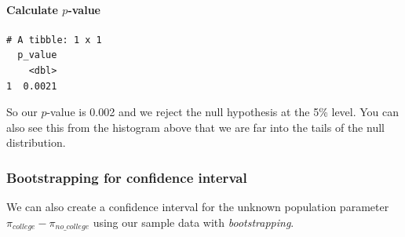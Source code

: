 \documentclass[12pt,]{krantz}
\makeatletter
\newenvironment{Shaded}{\begin{snugshade}}{\end{snugshade}}
\newcommand{\KeywordTok}[1]{\textcolor[rgb]{0.27,0.27,0.27}{\textbf{#1}}}
\newcommand{\DataTypeTok}[1]{\textcolor[rgb]{0.27,0.27,0.27}{#1}}
\newcommand{\DecValTok}[1]{\textcolor[rgb]{0.06,0.06,0.06}{#1}}
\newcommand{\StringTok}[1]{\textcolor[rgb]{0.5,0.5,0.5}{#1}}
\newcommand{\OperatorTok}[1]{\textcolor[rgb]{0.43,0.43,0.43}{\textbf{#1}}}
\newcommand{\NormalTok}[1]{#1}
\let\oldparagraph\paragraph
\renewcommand{\paragraph}[1]{\oldparagraph{#1}\mbox{}}
\newenvironment{kframe}{%
\medskip{}
\setlength{\fboxsep}{.8em}
 \def\at@end@of@kframe{}%
 \ifinner\ifhmode%
  \def\at@end@of@kframe{\end{minipage}}%
  \begin{minipage}{\columnwidth}%
 \fi\fi%
 \def\FrameCommand##1{\hskip\@totalleftmargin \hskip-\fboxsep
 \colorbox{shadecolor}{##1}\hskip-\fboxsep
     \hskip-\linewidth \hskip-\@totalleftmargin \hskip\columnwidth}%
 \MakeFramed {\advance\hsize-\width
   \@totalleftmargin\z@ \linewidth\hsize
   \@setminipage}}%
 {\par\unskip\endMakeFramed%
 \at@end@of@kframe}
\renewenvironment{Shaded}{\begin{kframe}}{\end{kframe}}
\theoremstyle{definition}
\theoremstyle{definition}
\theoremstyle{definition}
\theoremstyle{remark}
\makeatother
\begin{document}
\paragraph{\texorpdfstring{Calculate
\(p\)-value}{Calculate p-value}}\label{calculate-p-value-2}

\begin{Shaded}
\end{Shaded}

\begin{verbatim}
# A tibble: 1 x 1
  p_value
    <dbl>
1  0.0021
\end{verbatim}

So our \(p\)-value is 0.002 and we reject the null hypothesis at the 5\%
level. You can also see this from the histogram above that we are far
into the tails of the null distribution.

\subsubsection*{Bootstrapping for confidence
interval}\label{bootstrapping-for-confidence-interval-2}

We can also create a confidence interval for the unknown population
parameter \(\pi_{college} - \pi_{no\_college}\) using our sample data
with \emph{bootstrapping}.

\begin{Shaded}
\end{Shaded}
\end{document}
